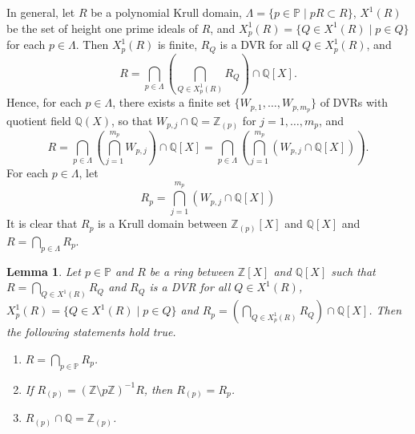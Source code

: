\documentclass[10pt]{article}
\numberwithin{equation}{section}
\newtheorem{Lem}[equation]{Lemma}
\theoremstyle{definition}
\theoremstyle{definition}
\newcommand{\Q}{\mathbb{Q}}
\newcommand{\Z}{\mathbb{Z}}
\newcommand{\PP}{\mathbb{P}}
\newcommand\rc { \color{red}}
\begin{document}
In general, let $R$ be a polynomial Krull domain,
$\Lambda = \{p \in \PP \mid pR \subset R\}$, $X^1(R)$ be the set
of height one prime ideals of $R$, and $X^1_p(R) = \{Q \in X^1(R) \mid p \in Q\}$ for each $p \in \Lambda$.
Then $X^1_p(R)$ is finite, $R_Q$ is a DVR for all $Q \in X^1_p(R)$, and
$$R = \bigcap_{p \in \Lambda}(\bigcap_{Q \in X^1_p(R)}R_Q) \cap \Q[X].$$
Hence, for each $p \in \Lambda$, there exists a finite set $\{W_{p,1}, \dots , W_{p,m_p}\}$
of DVRs with quotient field $\Q(X)$, so that $W_{p,j} \cap \Q = \Z_{(p)}$ for $j =1, \dots , m_p$, and
\begin{equation}\label{representation Krull domain}
R = \bigcap_{p \in \Lambda}(\bigcap_{j=1}^{m_p}W_{p,j}) \cap \Q[X] = \bigcap_{p \in \Lambda}(\bigcap_{j=1}^{m_p}(W_{p,j} \cap \Q[X])).
\end{equation}
For each $p \in \Lambda$, let 
\begin{equation}\label{localization R at p}
R_p = \bigcap_{j=1}^{m_p}(W_{p,j} \cap \Q[X])    
\end{equation}
It is clear that
$R_p$ is a Krull domain between $\Z_{(p)}[X]$ and $\Q[X]$ and $R = \bigcap\limits_{p \in \Lambda}R_p$.
\vskip0.5cm



\begin{Lem} \label{lemma43}
Let $p\in\PP$ and $R$ be a ring between $\Z[X]$ and $\Q[X]$ such that
$R = \bigcap\limits_{Q \in X^1(R)}R_Q$ and $R_Q$ is a DVR for all $Q \in X^1(R)$, $X^1_p(R) = \{Q \in X^1(R) \mid p \in Q\}$ 
and $R_p = (\bigcap\limits_{Q \in X^1_p(R)}R_Q) \cap \Q[X]$. 
Then the following statements hold true. 
\begin{enumerate}
\item[{\em (1)}] $R = \bigcap\limits_{p \in \PP}R_p$.
\item[{\em (2)}] If $R_{(p)}=(\Z\setminus p\Z)^{-1}R$, then $R_{(p)}=R_p$.
\item[{\em (3)}] $R_{(p)} \cap \Q = \Z_{(p)}$.
\end{enumerate} 
\end{Lem}
\end{document}
